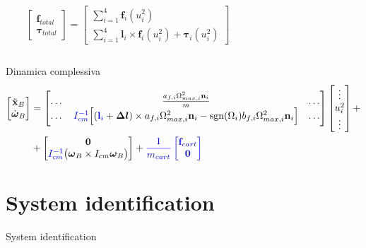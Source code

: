 \documentclass[]{beamer}
\DeclareMathOperator*{\sgn}{sgn}                %
\begin{document}
	\begin{frame}
		\centering
		\begin{columns}
			\begin{column}{.4\textwidth}
				\centering
				\begin{equation*}
				\begin{bmatrix}
					\mathbf{f}_{total} \\
					\boldsymbol{\tau}_{total}
				\end{bmatrix}
				=
				\begin{bmatrix}
					\sum\limits_{i=1}^{4} \mathbf{f}_i(u_i^2) \\
					\sum\limits_{i=1}^{4} \mathbf{l}_i \times \mathbf{f}_i(u_i^2) + \boldsymbol{\tau}_i(u_i^2)
				\end{bmatrix}
				\end{equation*}
			\end{column}
			\begin{column}{.4\textwidth}
				\centering
				\begin{figure}
					
				\end{figure}					
			\end{column}
		\end{columns}
		\begin{block}{Dinamica complessiva}
			\tiny
			\begin{equation*}
			\begin{split}
				\begin{bmatrix}
					\ddot{\mathbf{x}}_B \\
					\dot{\boldsymbol{\omega}}_B
				\end{bmatrix}
				&=
				\begin{bmatrix}
					\dots & \frac{a_{f,i}\Omega_{max,i}^2\mathbf{n}_i}{m} & \dots \\
					\dots & \textcolor{blue}{I_{cm}^{-1}}\Big[ (\textcolor{blue}{\mathbf{l}_i}+\boldsymbol{\Delta l})\times a_{f,i}\Omega^2_{max,i}\mathbf{n}_i-\sgn(\Omega_i)b_{f,i}\Omega_{max,i}^2\mathbf{n}_i\Big] & \dots
				\end{bmatrix}
				\begin{bmatrix}
					\vdots \\
					u_i^2 \\
					\vdots
				\end{bmatrix}
					+ \\
					&+
				\begin{bmatrix}
					\mathbf{0} \\
					\textcolor{blue}{I_{cm}^{-1}}\bigl(\boldsymbol{\omega}_B \times I_{cm} \boldsymbol{\omega}_B \bigl)
				\end{bmatrix}
				+
				\textcolor{blue}{
				\frac{1}{m_{cart}}
				\begin{bmatrix}
					\mathbf{f}_{cart} \\
					\mathbf{0}
				\end{bmatrix} 
				}
			\end{split}
			\end{equation*}
		\end{block}
	\end{frame}


	\section{System identification}
	
	\begin{frame}{System identification}
		
	\end{frame}
\end{document}
